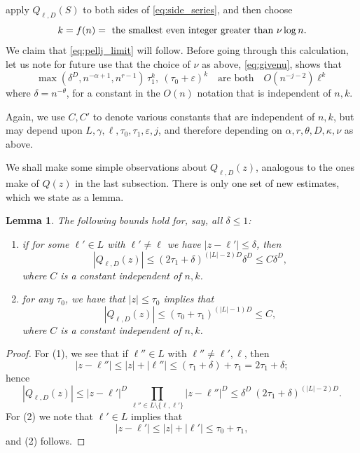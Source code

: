 \documentclass{memo-l}
\theoremstyle{plain}
\theoremstyle{definition}
\numberwithin{section}{chapter}
\numberwithin{equation}{chapter}
\theoremstyle{plain}
\newtheorem{lem}[theorem]{Lemma}
\theoremstyle{definition}
\begin{document}
apply \( Q_{\ell,D}(S) \) to both sides of \eqref{eq:side_series}, and then
choose \begin{equation}\label{eq:givek2} k =f(n)= \ \mbox{the smallest even
integer greater than \( \nu\log n \)}.  \end{equation} We claim that
\eqref{eq:pellj_limit} will follow.  Before going through this calculation,
let us note for future use that the choice of \( \nu \) as above,
\eqref{eq:givenu}, shows that \begin{equation}\label{eq:nufacts}
\max(\delta^D,n^{-\alpha+1},n^{r-1}) \,\tau_1^k,\ (\tau_0+\varepsilon)^k
\quad\mbox{are both}\quad O(n^{-j-2}) \ell^k \end{equation} where \(
\delta=n^{-\theta} \), for a constant in the \( O(n) \) notation that is
independent of \( n,k \).


Again, we use \( C,C' \) to denote various constants that are independent
of \( n,k \), but may depend upon \(
L,\gamma,\ell,\tau_0,\tau_1,\varepsilon,j \), and therefore depending on \(
\alpha,r,\theta,D,\kappa,\nu \) as above.

We shall make some simple observations about \( Q_{\ell,D}(z) \), analogous
to the ones make of \( Q(z) \) in the last subsection.  There is only one set
of new estimates, which we state as a lemma.

\begin{lem} \label{le:QellD_est}
The following bounds hold for, say, all \( \delta\leq 1 \):
\begin{enumerate} \item if for some \( \ell'\in L \) with \( \ell'\ne \ell
\) we have \( |z-\ell'|\leq \delta \), then \[ |Q_{\ell,D}(z)| \leq
(2\tau_1+\delta)^{(|L|-2)D} \delta^D \leq C\delta^D, \] where \( C \) is a
constant independent of \( n,k \).  \item for any \( \tau_0 \), we have
that \( |z|\leq \tau_0 \) implies that \[ |Q_{\ell,D}(z)| \leq
(\tau_0+\tau_1)^{(|L|-1)D} \leq C, \] where \( C \) is a constant
independent of \( n,k \).  \end{enumerate} \end{lem} \begin{proof} For (1),
we see that if \( \ell''\in L \) with \( \ell''\ne \ell',\ell \), then \[
|z-\ell''|\leq |z| + |\ell''| \leq (\tau_1+\delta) + \tau_1=
2\tau_1+\delta; \] hence \[ |Q_{\ell,D}(z)| \leq |z-\ell'|^D \
\prod_{\ell''\in L\setminus\{\ell,\ell'\}} |z-\ell''|^D \leq \delta^D \
(2\tau_1+\delta)^{(|L|-2)D}.  \] For (2) we note that \( \ell'\in L \)
implies that \[ |z-\ell'| \leq |z| + |\ell'| \leq \tau_0+\tau_1, \] and (2)
follows.  \end{proof}
\end{document}
